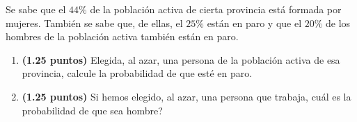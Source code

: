 
Se sabe que el $44\%$ de la población activa de cierta provincia está formada por mujeres. También se sabe que, de ellas, el $25\%$ están en paro y que el $20\%$ de los hombres de la población activa también están en paro.
\begin{enumerate}[label=\alph*)]
\item \textbf{(1.25 puntos)} Elegida, al azar, una persona de la población activa de esa provincia, calcule la probabilidad de que esté en paro.
\item \textbf{(1.25 puntos)} Si hemos elegido, al azar, una persona que trabaja, \textquestiondown{}cuál es la probabilidad de que sea hombre?
\end{enumerate}

